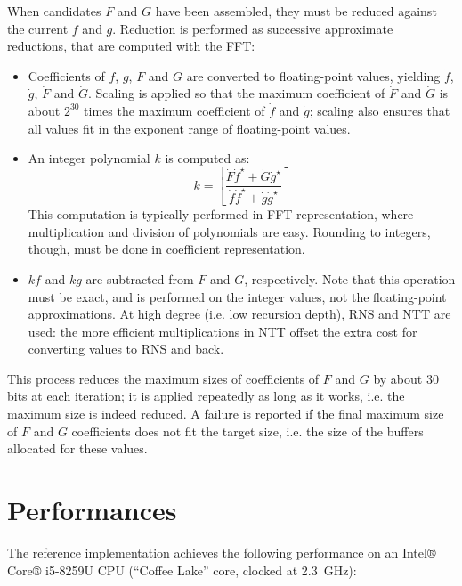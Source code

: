 When candidates $F$ and $G$ have been assembled, they must be reduced
against the current $f$ and $g$. Reduction is performed as successive
approximate reductions, that are computed with the FFT:
\begin{itemize}

  \item Coefficients of $f$, $g$, $F$ and $G$ are converted to
  floating-point values, yielding $\dot f$, $\dot g$, $\dot F$ and $\dot
  G$. Scaling is applied so that the maximum coefficient of $\dot F$ and
  $\dot G$ is about $2^{30}$ times the maximum coefficient of $\dot f$
  and $\dot g$; scaling also ensures that all values fit in the exponent
  range of floating-point values.

  \item An integer polynomial $k$ is computed as:
  \begin{equation}
    k = \left\lfloor \frac{\dot F\dot f^\star + \dot G\dot g^\star}{\dot f\dot f^\star + \dot g\dot g^\star} \right\rceil
  \end{equation}
  This computation is typically performed in FFT representation, where
  multiplication and division of polynomials are easy. Rounding to
  integers, though, must be done in coefficient representation.

  \item $kf$ and $kg$ are subtracted from $F$ and $G$, respectively.
  Note that this operation must be exact, and is performed on the
  integer values, not the floating-point approximations. At high degree
  (i.e. low recursion depth), RNS and NTT are used: the more efficient
  multiplications in NTT offset the extra cost for converting values to
  RNS and back.

\end{itemize}

This process reduces the maximum sizes of coefficients of $F$ and $G$ by
about 30 bits at each iteration; it is applied repeatedly as long as it
works, i.e. the maximum size is indeed reduced. A failure is reported if
the final maximum size of $F$ and $G$ coefficients does not fit the
target size, i.e. the size of the buffers allocated for these values.


\section{Performances}\label{sec:impl:perf}

The \falcon reference implementation achieves the following performance
on an Intel® Core® i5-8259U CPU (``Coffee Lake'' core, clocked at
2.3~GHz):

